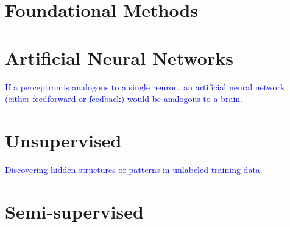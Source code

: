 \chapter{Foundational Methods}















\chapter{Artificial Neural Networks}

\textcolor{blue}{If a perceptron is analogous to a single neuron, an artificial neural network (either feedforward or feedback) would be analogous to a brain.}










\chapter{Unsupervised}

\textcolor{blue}{Discovering hidden structures or patterns in unlabeled training data.}






\chapter{Semi-supervised}


